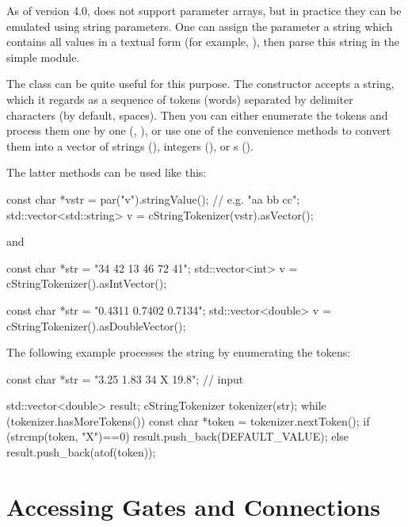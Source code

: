 As of version 4.0, {\opp} does not support parameter arrays,
but in practice they can be emulated using string parameters.
One can assign the parameter a string which contains all values
in a textual form (for example, ), then
parse this string in the simple module.

The  class can be quite useful for this
purpose. The constructor accepts a string, which it regards as
a sequence of tokens (words) separated by delimiter characters
(by default, spaces). Then you can either enumerate the tokens
and process them one by one (, ),
or use one of the  convenience methods to convert
them into a vector of strings (), integers (),
or s ().

The latter methods can be used like this:

\begin{cpp}
const char *vstr = par("v").stringValue(); // e.g. "aa bb cc";
std::vector<std::string> v = cStringTokenizer(vstr).asVector();
\end{cpp}

and

\begin{cpp}
const char *str = "34 42 13 46 72 41";
std::vector<int> v = cStringTokenizer().asIntVector();

const char *str = "0.4311 0.7402 0.7134";
std::vector<double> v = cStringTokenizer().asDoubleVector();
\end{cpp}

The following example processes the string by enumerating the tokens:

\begin{cpp}
const char *str = "3.25 1.83 34 X 19.8"; // input

std::vector<double> result;
cStringTokenizer tokenizer(str);
while (tokenizer.hasMoreTokens())
{
    const char *token = tokenizer.nextToken();
    if (strcmp(token, "X")==0)
        result.push_back(DEFAULT_VALUE);
    else
        result.push_back(atof(token));
}
\end{cpp}



\section{Accessing Gates and Connections}
\label{sec:simple-modules:gates}


